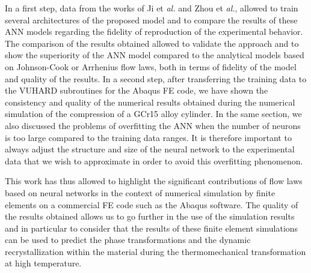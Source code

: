 \documentclass[algorithms,article,submit,pdftex,moreauthors]{Definitions/mdpi}
\makeatletter
\DeclareRobustCommand{\eal}{et \emph{al.}\@\xspace}
\makeatother
\begin{document}
In a first step, data from the works of Ji \eal \cite{Ji-2018} and Zhou \eal \cite{Zhou-2020}, allowed to train several architectures of the proposed model and to compare the results of these ANN models regarding the fidelity of reproduction of the experimental behavior.
The comparison of the results obtained allowed to validate the approach and to show the superiority of the ANN model compared to the analytical models based on Johnson-Cook or Arrhenius flow laws, both in terms of fidelity of the model and quality of the results.
In a second step, after transferring the training data to the VUHARD subroutines for the Abaqus FE code, we have shown the consistency and quality of the numerical results obtained during the numerical simulation of the compression of a GCr15 alloy cylinder.
In the same section, we also discussed the problems of overfitting the ANN when the number of neurons is too large compared to the training data ranges.
It is therefore important to always adjust the structure and size of the neural network to the experimental data that we wish to approximate in order to avoid this overfitting phenomenon.

This work has thus allowed to highlight the significant contributions of flow laws based on neural networks in the context of numerical simulation by finite elements on a commercial FE code such as the Abaqus software.
The quality of the results obtained allows us to go further in the use of the simulation results and in particular to consider that the results of these finite element simulations can be used to predict the phase transformations and the dynamic recrystallization within the material during the thermomechanical transformation at high temperature.

\vspace{6pt}

\end{document}
